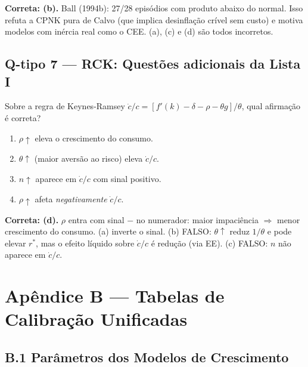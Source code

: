 \documentclass[12pt, a4paper]{article}
\begin{document}
\begin{resultbox}[title={Gabarito: (b)}]
\textbf{Correta: (b).} Ball (1994b): 27/28 episódios com produto abaixo do normal. Isso refuta a CPNK pura de Calvo (que implica desinflação crível sem custo) e motiva modelos com inércia real como o CEE. (a), (c) e (d) são todos incorretos.
\end{resultbox}

\subsection*{Q-tipo 7 --- RCK: Questões adicionais da Lista I}

Sobre a regra de Keynes-Ramsey $\dot{c}/c = [f'(k)-\delta-\rho-\theta g]/\theta$, qual afirmação é correta?

\begin{enumerate}[label=(\alph*)]
  \item $\rho\uparrow$ eleva o crescimento do consumo.
  \item $\theta\uparrow$ (maior aversão ao risco) eleva $\dot{c}/c$.
  \item $n\uparrow$ aparece em $\dot{c}/c$ com sinal positivo.
  \item $\rho\uparrow$ afeta \emph{negativamente} $\dot{c}/c$.
\end{enumerate}

\begin{resultbox}[title={Gabarito: (d)}]
\textbf{Correta: (d).} $\rho$ entra com sinal $-$ no numerador: maior impaciência $\Rightarrow$ menor crescimento do consumo. (a) inverte o sinal. (b) FALSO: $\theta\uparrow$ reduz $1/\theta$ e pode elevar $r^*$, mas o efeito líquido sobre $\dot{c}/c$ é redução (via EE). (c) FALSO: $n$ não aparece em $\dot{c}/c$.
\end{resultbox}

\section*{\large\color{cyanrbc} Apêndice B --- Tabelas de Calibração Unificadas}

\subsection*{B.1 Parâmetros dos Modelos de Crescimento}
\end{document}
